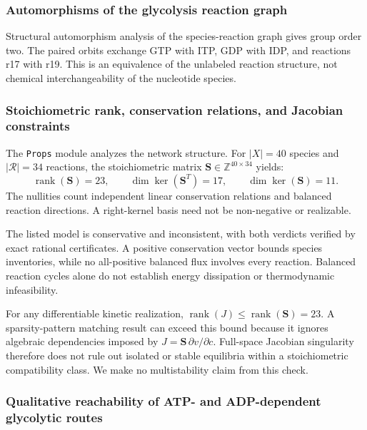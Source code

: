 \documentclass[pdflatex,referee]{../template/sn-jnl}
\theoremstyle{plain}%
\theoremstyle{definition}%
\theoremstyle{remark}%
\begin{document}
\subsubsection{Automorphisms of the glycolysis reaction graph}

Structural automorphism analysis of the species-reaction graph gives group order two. The paired orbits exchange GTP with ITP, GDP with IDP, and reactions r17 with r19. This is an equivalence of the unlabeled reaction structure, not chemical interchangeability of the nucleotide species.

\subsubsection{Stoichiometric rank, conservation relations, and Jacobian constraints}

The \texttt{Props} module analyzes the network structure. For $|X|=40$ species and $|\mathscr{R}|=34$ reactions, the stoichiometric matrix $\mathbf{S} \in \mathbb{Z}^{40 \times 34}$ yields:
\begin{equation}
\operatorname{rank}(\mathbf{S}) = 23,
\qquad
\dim\ker(\mathbf{S}^{T}) = 17,
\qquad
\dim\ker(\mathbf{S}) = 11.
\end{equation}
The nullities count independent linear conservation relations and balanced reaction directions. A right-kernel basis need not be non-negative or realizable.

The listed model is conservative and inconsistent, with both verdicts verified by exact rational certificates. A positive conservation vector bounds species inventories, while no all-positive balanced flux involves every reaction. Balanced reaction cycles alone do not establish energy dissipation or thermodynamic infeasibility.

For any differentiable kinetic realization, $\operatorname{rank}(J)\le\operatorname{rank}(\mathbf S)=23$. A sparsity-pattern matching result can exceed this bound because it ignores algebraic dependencies imposed by $J=\mathbf S\,\partial v/\partial c$. Full-space Jacobian singularity therefore does not rule out isolated or stable equilibria within a stoichiometric compatibility class. We make no multistability claim from this check.

\subsubsection{Qualitative reachability of ATP- and ADP-dependent glycolytic routes}
\end{document}
